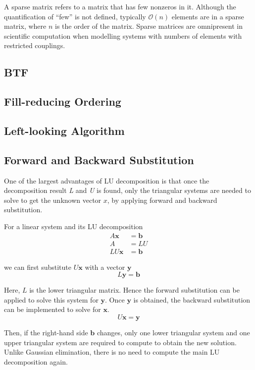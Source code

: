 \documentclass[11pt,a4paper]{article}
\begin{document}
A sparse matrix refers to a matrix that has few nonzeros in it. Although the quantification of ``few'' is not defined, typically \(\mathcal{O}(n)\) elements are in a sparse matrix, where \(n\) is the order of the matrix. Sparse matrices are omnipresent in scientific computation when modelling systems with numbers of elements with restricted couplings.

\subsection{BTF}

\subsection{Fill-reducing Ordering}

\subsection{Left-looking Algorithm}

\subsection{Forward and Backward Substitution}
One of the largest advantages of LU decomposition is that once the decomposition result \emph{L} and \emph{U} is found, only the triangular systems are needed to solve to get the unknown vector \(x\), by applying forward and backward substitution.

For a linear system and its LU decomposition
\begin{align}
    A\bm{x}  & =\bm{b} \\
    A        & =LU     \\
    LU\bm{x} & =\bm{b}
\end{align}

we can first substitute \(U\bm{x}\) with a vector \(\bm{y}\)
\begin{equation}
    L\bm{y}=\bm{b}\label{eq:lowtri}
\end{equation}

Here, \(L\) is the lower triangular matrix. Hence the forward substitution can be applied to solve this system for \(\bm{y}\). Once \(\bm{y}\) is obtained, the backward substitution can be implemented to solve for \(\bm{x}\).
\begin{equation}
    U\bm{x}=\bm{y}
\end{equation}

Then, if the right-hand side \(\bm{b}\) changes, only one lower triangular system and one upper triangular system are required to compute to obtain the new solution. Unlike Gaussian elimination, there is no need to compute the main LU decomposition again.
\end{document}

